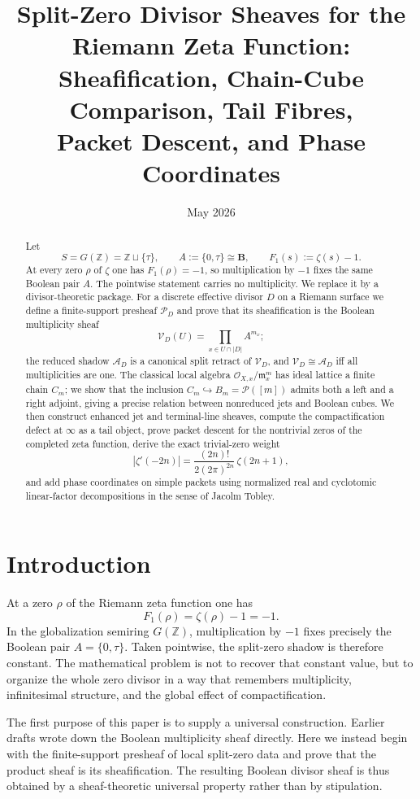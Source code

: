 \documentclass[11pt,a4paper]{article}
\title{Split-Zero Divisor Sheaves for the Riemann Zeta Function:\\
Sheafification, Chain-Cube Comparison, Tail Fibres,\\
Packet Descent, and Phase Coordinates}
\author{}
\date{May 2026}
\theoremstyle{definition}
\theoremstyle{remark}
\newcommand{\ZZ}{\mathbb Z}
\newcommand{\BB}{\mathbf B}
\newcommand{\cO}{\mathcal O}
\newcommand{\cP}{\mathcal P}
\newcommand{\taup}{\tau}
\newcommand{\into}{\hookrightarrow}
\newcommand{\Vd}{\mathcal V_D}
\newcommand{\Ad}{\mathcal A_D}
\newcommand{\Pd}{\mathcal P_D}
\begin{document}
\maketitle

\begin{abstract}
Let
\[
S=G(\ZZ)=\ZZ\sqcup\{\taup\},\qquad A:=\{0,\taup\}\cong\BB,\qquad F_1(s):=\zeta(s)-1.
\]
At every zero $\rho$ of $\zeta$ one has $F_1(\rho)=-1$, so multiplication by $-1$ fixes the same Boolean pair $A$. The pointwise statement carries no multiplicity. We replace it by a divisor-theoretic package. For a discrete effective divisor $D$ on a Riemann surface we define a finite-support presheaf $\Pd$ and prove that its sheafification is the Boolean multiplicity sheaf
\[
\Vd(U)=\prod_{x\in U\cap |D|}A^{m_x};
\]
the reduced shadow $\Ad$ is a canonical split retract of $\Vd$, and $\Vd\cong\Ad$ iff all multiplicities are one. The classical local algebra $\cO_{X,x}/\mathfrak m_x^m$ has ideal lattice a finite chain $C_m$; we show that the inclusion $C_m\into B_m=\cP([m])$ admits both a left and a right adjoint, giving a precise relation between nonreduced jets and Boolean cubes. We then construct enhanced jet and terminal-line sheaves, compute the compactification defect at $\infty$ as a tail object, prove packet descent for the nontrivial zeros of the completed zeta function, derive the exact trivial-zero weight
\[
|\zeta'(-2n)|=\frac{(2n)!}{2(2\pi)^{2n}}\,\zeta(2n+1),
\]
and add phase coordinates on simple packets using normalized real and cyclotomic linear-factor decompositions in the sense of Jacolm Tobley.
\end{abstract}

\tableofcontents

\section{Introduction}

At a zero $\rho$ of the Riemann zeta function one has
\[
F_1(\rho)=\zeta(\rho)-1=-1.
\]
In the globalization semiring $G(\ZZ)$, multiplication by $-1$ fixes precisely the Boolean pair $A=\{0,\taup\}$. Taken pointwise, the split-zero shadow is therefore constant. The mathematical problem is not to recover that constant value, but to organize the whole zero divisor in a way that remembers multiplicity, infinitesimal structure, and the global effect of compactification.

The first purpose of this paper is to supply a universal construction. Earlier drafts wrote down the Boolean multiplicity sheaf directly. Here we instead begin with the finite-support presheaf of local split-zero data and prove that the product sheaf is its sheafification. The resulting Boolean divisor sheaf is thus obtained by a sheaf-theoretic universal property rather than by stipulation.
\end{document}
